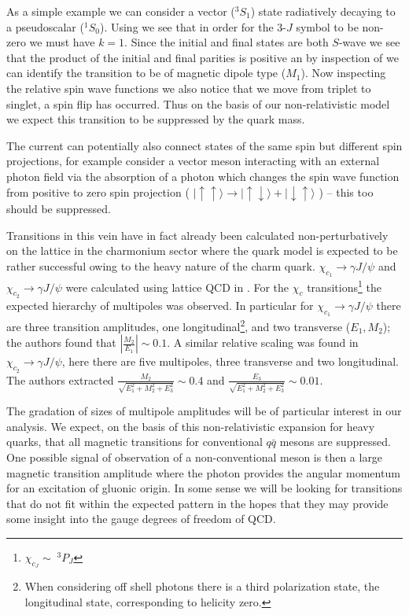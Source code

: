 As a simple example we can consider a vector ($^3S_1$) state radiatively decaying to a pseudoscalar ($^1S_0$). Using  we see that in order for the 3-$J$ symbol to be non-zero we must have $k=1$. Since the initial and final states are both $S$-wave we see that the product of the initial and final parities is positive an by inspection of  we can identify the transition to be of magnetic dipole type ($M_1$). Now inspecting the relative spin wave functions we also notice that we move from triplet to singlet, a spin flip has occurred. Thus on the basis of our non-relativistic model we expect this transition to be suppressed by the quark mass. 

The current can potentially also connect states of the same spin but different spin projections, for example consider a vector meson interacting with an external photon field via the absorption of a photon which changes the spin wave function from positive to zero spin projection ( $|\!\!\uparrow \uparrow \rangle \rightarrow |\!\!\uparrow \downarrow \rangle +  |\!\!\downarrow \uparrow \rangle$ ) -- this too should be suppressed. 

Transitions in this vein have in fact already been calculated non-perturbatively on the lattice in the charmonium sector where the quark model is expected to be rather successful owing to the heavy nature of the charm quark.  $\chi_{c_1}\rightarrow \gamma J/\psi$ and $\chi_{c_2} \rightarrow \gamma J/\psi$ were calculated using lattice QCD in \cite{Dudek:2009kk,Dudek:2006ej}. For the $\chi_c$ transitions\footnote{$\chi_{c_J} \sim \;^3P_J$} the expected hierarchy of multipoles was observed. In particular for $\chi_{c_1}\rightarrow \gamma J/\psi$ there are three transition amplitudes, one longitudinal\footnote{When considering off shell photons there is a third polarization state, the longitudinal state, corresponding to helicity zero.}, and two transverse ($E_1, M_2$); the authors found that $|\frac{M_2}{E_1}| \sim 0.1$. A similar relative scaling was found in $\chi_{c_2} \rightarrow \gamma J/\psi$, here there are five multipoles, three transverse and two longitudinal. The authors extracted $\frac{M_2}{\sqrt{E_1^2 + M_2^2 + E_3^2}} \sim 0.4$ and $\frac{E_3}{\sqrt{E_1^2 + M_2^2 + E_3^2}} \sim 0.01$.

The gradation of sizes of multipole amplitudes will be of particular interest in our analysis. We expect, on the basis of this non-relativistic expansion for heavy quarks, that all magnetic transitions for conventional $q\bar{q}$ mesons are suppressed.  One possible signal of observation of a non-conventional meson is then a large magnetic transition amplitude where the photon provides the angular momentum for an excitation of gluonic origin. In some sense we will be looking for transitions that do not fit within the expected pattern in the hopes that they may provide some insight into the gauge degrees of freedom of QCD. 

